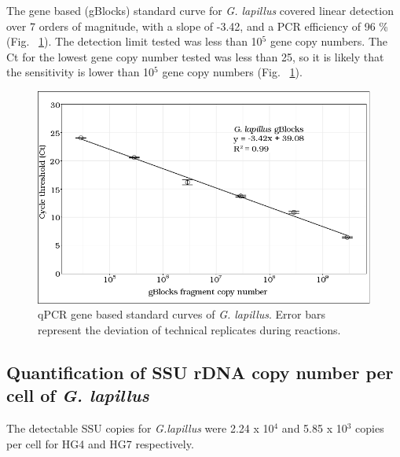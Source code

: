 \documentclass[12pt]{article}
\begin{document}
The gene based (gBlocks) standard curve for \emph{G. lapillus} covered linear detection over 7 orders of magnitude, with a slope of -3.42, and a PCR efficiency of 96 \% (Fig. ~\ref{fig:lapigblocks}). 
The detection limit tested was less than 10$^{5}$ gene copy numbers. 
The Ct for the lowest gene copy number tested was less than 25, so it is likely that the sensitivity is lower than 10$^{5}$ gene copy numbers (Fig. ~\ref{fig:lapigblocks}).\\
\begin{figure}
\includegraphics[scale=.8]{Hero_qpcr-figs/Fig4.png}
\caption{qPCR gene based standard curves of \emph{G. lapillus}. Error bars represent the deviation of technical replicates during reactions.}%
\label{fig:lapigblocks}
\end{figure}
\FloatBarrier

\FloatBarrier

\subsection*{Quantification of SSU rDNA copy number per cell of \emph{G. lapillus}}%
The detectable SSU copies for \emph{G.lapillus} were 2.24 x 10$^{4}$ and 5.85 x 10$^{3}$ copies per cell for HG4 and HG7 respectively. 
\end{document}
